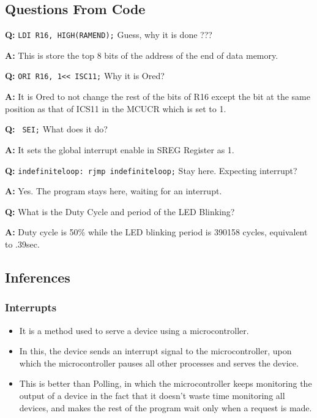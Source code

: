 \documentclass[titlepage, 11pt]{article}
\newenvironment{qanda}{\setlength{\parindent}{0pt}}{\bigskip}
\newcommand{\Q}{\bigskip\textbf{Q:} }
\newcommand{\A}{\par\textbf{A:} \normalfont}
\begin{document}
{\renewcommand\fcolorbox[4][]{\textcolor{black}{\strut#4}}
\inputminted[breaklines,
 mathescape,
 linenos,
 numbersep=5pt,
 frame=single,
 numbersep=5pt,
 xleftmargin=0pt]{asm}{"Prob1.asm"}}

\subsection{Questions From Code}
\begin{qanda}

\Q \texttt{LDI R16, HIGH(RAMEND);} Guess, why it is done ???
\A This is store the top 8 bits of the address of the end of data memory.

\Q {\renewcommand\fcolorbox[4][]{\textcolor{black}{\strut#4}}\texttt{ORI R16, 1<< ISC11;}} Why it is Ored?
\A It is Ored to not change the rest of the bits of R16 except the bit at the same position as that of ICS11 in the MCUCR which is set to 1. 

\Q\texttt{ SEI;} What does it do?
\A It sets the global interrupt enable in SREG Register as 1.

\Q \texttt{indefiniteloop: rjmp indefiniteloop;} Stay here. Expecting interrupt? 
\A Yes. The program stays here, waiting for an interrupt.

\Q What is the Duty Cycle and period of the LED Blinking?
\A Duty cycle is 50\%  while the LED blinking period is 390158 cycles, equivalent to  .39sec.

\end{qanda}


\subsection{Inferences}

\subsubsection{Interrupts}
\begin{itemize}
    \item It is a method used to serve a device using a microcontroller.
    \item In this, the device sends an interrupt signal to the microcontroller, upon which the microcontroller pauses all other processes and serves the device.
    \item This is better than Polling, in which the microcontroller keeps monitoring the output of a device in the fact that it doesn't waste time monitoring all devices, and makes the rest of the program wait only when a request is made.
\end{itemize}
\end{document}
